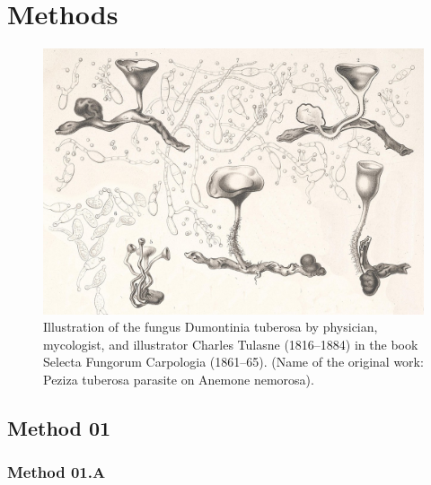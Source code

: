 \section{Methods}
\blindtext

\begin{figure}[!htpb]
    \centering
    \includegraphics[width=\linewidth]{Figures/PezizaTuberosa.jpg}
    \caption{Illustration of the fungus Dumontinia tuberosa by physician, mycologist, and illustrator Charles Tulasne (1816–1884) in the book Selecta Fungorum Carpologia (1861–65). (Name of the original work: Peziza tuberosa parasite on Anemone nemorosa).}
    \label{fig:tcanther}
\end{figure}

\subsection{Method 01}
\blindtext

\subsubsection{Method 01.A}
\blindtext